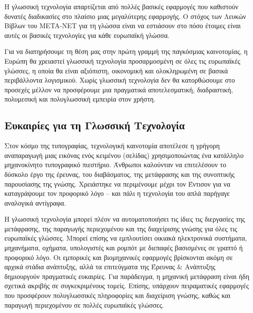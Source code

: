 \documentclass[]{../../metanetpaper}
\begin{document}
\begin{multicols}{2}
Η γλωσσική τεχνολογία απαρτίζεται από πολλές βασικές εφαρμογές που καθιστούν δυνατές διαδικασίες στο πλαίσιο μιας μεγαλύτερης εφαρμογής. Ο στόχος των Λευκών Βίβλων του META-NET για τη γλώσσα είναι να εστιάσουν στο πόσο έτοιμες είναι αυτές οι βασικές τεχνολογίες για κάθε ευρωπαϊκή γλώσσα. 


Για να διατηρήσουμε τη θέση μας στην πρώτη γραμμή της παγκόσμιας καινοτομίας, η Ευρώπη θα χρειαστεί γλωσσική τεχνολογία προσαρμοσμένη σε όλες τις ευρωπαϊκές γλώσσες, η οποία θα είναι αξιόπιστη, οικονομική και ολοκληρωμένη σε βασικά περιβάλλοντα λογισμικού. Χωρίς γλωσσική τεχνολογία δεν θα κατορθώσουμε στο προσεχές μέλλον να προσφέρουμε μια πραγματικά αποτελεσματική, διαδραστική, πολυμεσική και πολυγλωσσική εμπειρία στον χρήστη.

\subsection{Ευκαιρίες για τη Γλωσσική Τεχνολογία}

Στον κόσμο της τυπογραφίας, τεχνολογική καινοτομία αποτέλεσε η γρήγορη αναπαραγωγή μιας εικόνας ενός κειμένου (σελίδας) χρησιμοποιώντας ένα κατάλληλο μηχανοκίνητο τυπογραφικό πιεστήριο. Άνθρωποι καλούνταν να επιτελέσουν το δύσκολο έργο της έρευνας, του διαβάσματος, της μετάφρασης και της συνοπτικής παρουσίασης της γνώσης. Χρειάστηκε να περιμένουμε μέχρι τον Έντισον για να καταγράψουμε τον προφορικό λόγο – και πάλι η τεχνολογία του απλά παρήγαγε αναλογικά αντίγραφα.

Η γλωσσική τεχνολογία μπορεί πλέον να αυτοματοποιήσει τις ίδιες τις διεργασίες της μετάφρασης, της παραγωγής περιεχομένου και της διαχείρισης γνώσης για όλες τις ευρωπαϊκές γλώσσες. Μπορεί επίσης να εμπλουτίσει οικιακά ηλεκτρονικά συστήματα, μηχανήματα, οχήματα, υπολογιστές και ρομπότ με διεπαφές βασισμένες σε γραπτό ή προφορικό λόγο. Οι εμπορικές και βιομηχανικές εφαρμογές βρίσκονται ακόμη σε αρχικά στάδια ανάπτυξης, αλλά τα επιτεύγματα της Έρευνας \& Ανάπτυξης δημιουργούν πραγματικές ευκαιρίες. Για παράδειγμα, η μηχανική μετάφραση είναι ήδη σχετικά ακριβής σε συγκεκριμένους τομείς. Επίσης, υπάρχουν πειραματικές εφαρμογές που προσφέρουν πολυγλωσσικές πληροφορίες και διαχείριση γνώσης, καθώς και παραγωγή περιεχομένου σε πολλές ευρωπαϊκές γλώσσες.


\end{multicols}
\end{document}
